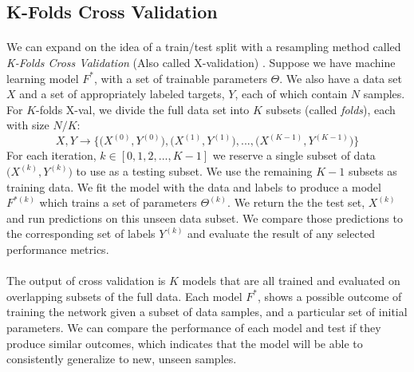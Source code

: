 \documentclass[12pt,letterpaper]{article}
\begin{document}

\subsection{K-Folds Cross Validation}
\label{subsec-XValidation}

\paragraph*{}We can expand on the idea of a train/test split with a resampling method called \textit{K-Folds Cross Validation} (Also called X-validation) \cite{Geron,James}. Suppose we have machine learning model $F^*$, with a set of trainable parameters $\Theta$. We also have a data set $X$ and a set of appropriately labeled targets, $Y$, each of which contain $N$ samples. For $K$-folds X-val, we divide the full data set into $K$ subsets (called \textit{folds}), each with size $N/K$:
\begin{equation}
\label{eqn-XValSplit}
X,Y \rightarrow \Big\{ \big(X^{(0)},Y^{(0)}\big) , \big(X^{(1)},Y^{(1)}\big) , ... , \big(X^{(K-1)},Y^{(K-1)}\big) \Big\}
\end{equation}
For each iteration, $k \in [0,1,2,...,K-1]$ we reserve a single subset of data $\big(X^{(k)},Y^{(k)}\big)$ to use as a testing subset. We use the remaining $K-1$ subsets as training data. We fit the model with the data and labels to produce a model $F^{*(k)}$ which trains a set of parameters $\Theta^{(k)}$. We return the the test set, $X^{(k)}$ and run predictions on this unseen data subset. We compare those predictions to the corresponding set of labels $Y^{(k)}$ and evaluate the result of any selected performance metrics.

\paragraph*{}The output of cross validation is $K$ models that are all trained and evaluated on overlapping subsets of the full data. Each model $F^*$, shows a possible outcome of training the network given a subset of data samples, and a particular set of initial parameters. We can compare the performance of each model and test if they produce similar outcomes, which indicates that the model will be able to consistently generalize to new, unseen samples.
\end{document}
